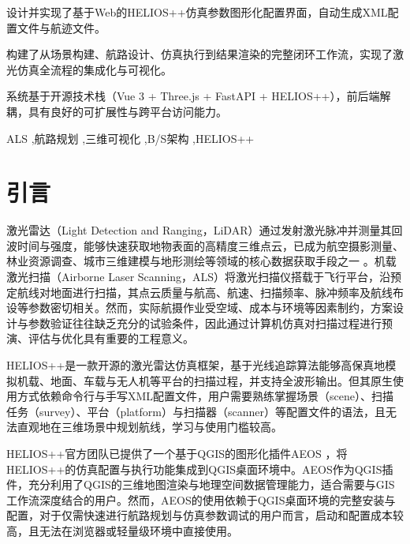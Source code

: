 \documentclass[a4paper,fleqn]{cas-sc}
\begin{document}

\begin{highlights}
  \item 设计并实现了基于Web的HELIOS++仿真参数图形化配置界面，自动生成XML配置文件与航迹文件。
  \item 构建了从场景构建、航路设计、仿真执行到结果渲染的完整闭环工作流，实现了激光仿真全流程的集成化与可视化。
  \item 系统基于开源技术栈（Vue 3 + Three.js + FastAPI + HELIOS++），前后端解耦，具有良好的可扩展性与跨平台访问能力。
\end{highlights}

\begin{keywords}
  ALS \sep 航路规划 \sep 三维可视化 \sep B/S架构 \sep HELIOS++
\end{keywords}

\MakeNJFUTitlePage[UseDocTitle]
\maketitle
\tableofcontents
\hrulefill

\section{引言}
激光雷达（Light Detection and Ranging，LiDAR）通过发射激光脉冲并测量其回波时间与强度，能够快速获取地物表面的高精度三维点云，已成为航空摄影测量、林业资源调查、城市三维建模与地形测绘等领域的核心数据获取手段之一 \citep{laserRemoteSensing}。机载激光扫描（Airborne Laser Scanning，ALS）将激光扫描仪搭载于飞行平台，沿预定航线对地面进行扫描，其点云质量与航高、航速、扫描频率、脉冲频率及航线布设等参数密切相关。然而，实际航摄作业受空域、成本与环境等因素制约，方案设计与参数验证往往缺乏充分的试验条件，因此通过计算机仿真对扫描过程进行预演、评估与优化具有重要的工程意义。

HELIOS++是一款开源的激光雷达仿真框架，基于光线追踪算法能够高保真地模拟机载、地面、车载与无人机等平台的扫描过程，并支持全波形输出。但其原生使用方式依赖命令行与手写XML配置文件，用户需要熟练掌握场景（scene）、扫描任务（survey）、平台（platform）与扫描器（scanner）等配置文件的语法，且无法直观地在三维场景中规划航线，学习与使用门槛较高。

HELIOS++官方团队已提供了一个基于QGIS的图形化插件AEOS \citep{aeos}，将HELIOS++的仿真配置与执行功能集成到QGIS桌面环境中。AEOS作为QGIS插件，充分利用了QGIS的三维地图渲染与地理空间数据管理能力，适合需要与GIS工作流深度结合的用户。然而，AEOS的使用依赖于QGIS桌面环境的完整安装与配置，对于仅需快速进行航路规划与仿真参数调试的用户而言，启动和配置成本较高，且无法在浏览器或轻量级环境中直接使用。
\end{document}
